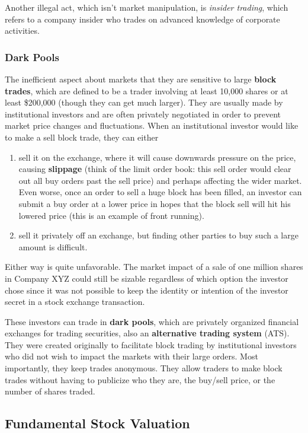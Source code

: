 \documentclass{article}
\begin{document}
  Another illegal act, which isn't market manipulation, is \textit{insider trading}, which refers to a company insider who trades on advanced knowledge of corporate activities. 

  \subsubsection{Dark Pools}

  The inefficient aspect about markets that they are sensitive to large \textbf{block trades}, which are defined to be a trader involving at least 10,000 shares or at least \$200,000 (though they can get much larger). They are usually made by institutional investors and are often privately negotiated in order to prevent market price changes and fluctuations. When an institutional investor would like to make a sell block trade, they can either 
  \begin{enumerate}
      \item sell it on the exchange, where it will cause downwards pressure on the price, causing \textbf{slippage} (think of the limit order book: this sell order would clear out all buy orders past the sell price) and perhaps affecting the wider market. Even worse, once an order to sell a huge block has been filled, an investor can submit a buy order at a lower price in hopes that the block sell will hit his lowered price (this is an example of front running). 
      \item sell it privately off an exchange, but finding other parties to buy such a large amount is difficult. 
  \end{enumerate}
  Either way is quite unfavorable. The market impact of a sale of one million shares in Company XYZ could still be sizable regardless of which option the investor chose since it was not possible to keep the identity or intention of the investor secret in a stock exchange transaction. 

  These investors can trade in \textbf{dark pools}, which are privately organized financial exchanges for trading securities, also an \textbf{alternative trading system} (ATS). They were created originally to facilitate block trading by institutional investors who did not wish to impact the markets with their large orders. Most importantly, they keep trades anonymous. They allow traders to make block trades without having to publicize who they are, the buy/sell price, or the number of shares traded. 

  \subsection{Fundamental Stock Valuation}
\end{document}
